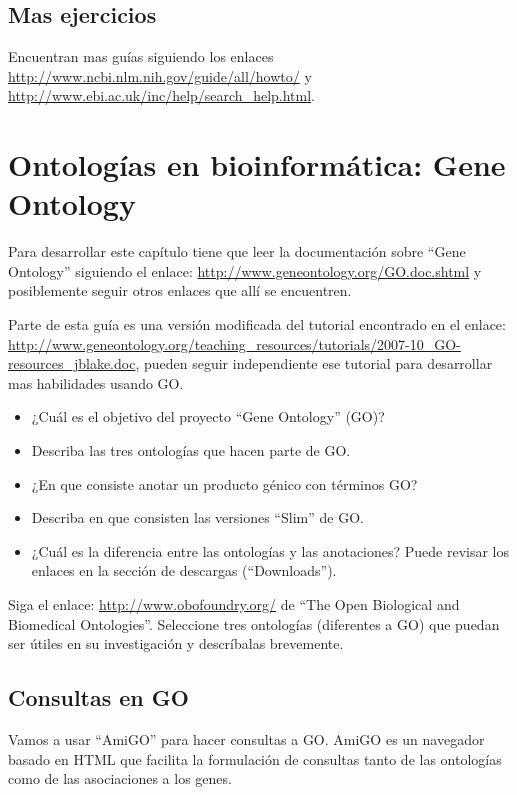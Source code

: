 \documentclass[letter,11pt]{book}
\begin{document}
\section{Mas ejercicios}

Encuentran mas guías siguiendo los enlaces \url{http://www.ncbi.nlm.nih.gov/guide/all/howto/} y \url{http://www.ebi.ac.uk/inc/help/search_help.html}.

\chapter{Ontologías en bioinformática: Gene Ontology}

Para desarrollar este capítulo tiene que leer la documentación sobre ``Gene Ontology'' siguiendo el enlace: \url{http://www.geneontology.org/GO.doc.shtml} y posiblemente seguir otros enlaces que allí se encuentren.

Parte de esta guía es una versión modificada del tutorial encontrado en el enlace: \url{http://www.geneontology.org/teaching_resources/tutorials/2007-10_GO-resources_jblake.doc}, pueden seguir independiente ese tutorial para desarrollar mas habilidades usando GO.

{\color{red}
\begin{itemize}
\item ¿Cuál es el objetivo del proyecto ``Gene Ontology'' (GO)?
\item Describa las tres ontologías que hacen parte de GO.
\item ¿En que consiste anotar un producto génico con términos GO?
\item Describa en que consisten las versiones ``Slim'' de GO.
\item ¿Cuál es la diferencia entre las ontologías y las anotaciones? Puede revisar los enlaces en la sección de descargas (``Downloads'').
\end{itemize}
}

Siga el enlace: \url{http://www.obofoundry.org/} de ``The Open Biological and Biomedical Ontologies''. {\color{red}Seleccione tres ontologías (diferentes a GO) que puedan ser útiles en su investigación y descríbalas brevemente.}

\section{Consultas en GO}

Vamos a usar ``AmiGO'' para hacer consultas a GO. AmiGO es un navegador basado en HTML que facilita la formulación de consultas tanto de las ontologías como de las asociaciones a los genes.
\end{document}

